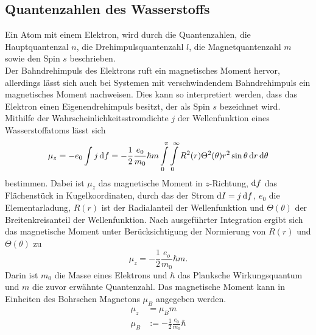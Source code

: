 \subsection{Quantenzahlen des Wasserstoffs}
Ein Atom mit einem Elektron, wird durch die Quantenzahlen, die Hauptquantenzal $n$, die Drehimpulsquantenzahl $l$, die Magnetquantenzahl $m$ sowie den Spin $s$ beschrieben.\\
Der Bahndrehimpuls des Elektrons ruft ein magnetisches Moment hervor, allerdings lässt sich auch bei Systemen mit verschwindendem Bahndrehimpuls ein magnetisches Moment nachweisen. 
Dies kann so interpretiert werden, dass das Elektron einen Eigenendrehimpuls besitzt, 
der als Spin $s$ bezeichnet wird.\\
Mithilfe der Wahrscheinlichkeitsstromdichte $j$ der Wellenfunktion eines Wasserstoffatoms lässt sich
\begin{align}
	\mu_z=-e_0\int j \dif f=-\frac{1}{2}\frac{e_0}{m_0}\hbar m \int\limits_{0}^{\pi}\int\limits_{0}^{\infty} R^2(r)\Theta^2(\theta)r^2\sin\theta \dif r\dif\theta
\end{align}
bestimmen. 
Dabei ist $\mu_z$ das magnetische Moment in $z$-Richtung, $\dif f$ das Flächenstück in Kugelkoordinaten, durch das der Strom $\dif I = j \dif f $, $e_0$ die Elementarladung, $R(r)$ ist der Radialanteil der Wellenfunktion und $\Theta(\theta)$ der Breitenkreisanteil der Wellenfunktion.
Nach ausgeführter Integration ergibt sich das magnetische Moment unter Berücksichtigung der Normierung von $R(r)$ und $\Theta(\theta)$ zu  
\begin{equation}
	\mu_z=-\frac{1}{2}\frac{e_o}{m_0}\hbar m.
\end{equation}
Darin ist $m_0$ die Masse eines Elektrons und $\hbar$ das Planksche Wirkungsquantum und $m$ die zuvor erwähnte Quantenzahl. 
Das magnetische Moment kann in Einheiten des Bohrschen Magnetons $\mu_B$ angegeben werden.
\begin{align}
	\mu_z &= \mu_B m\\
	\mu_B &:=-\frac{1}{2}\frac{e_0}{m_0}\hbar
\end{align}
